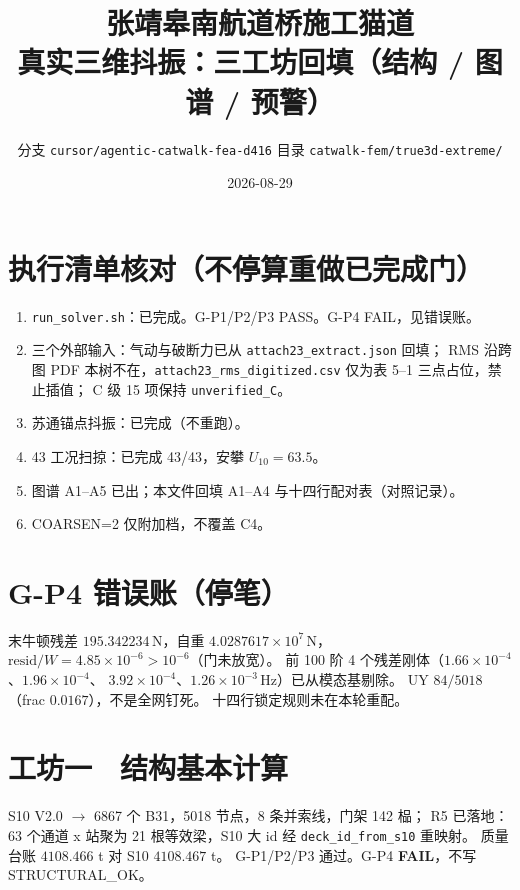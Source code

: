 \documentclass[11pt,a4paper]{ctexart}
\title{\bfseries 张靖皋南航道桥施工猫道\\真实三维抖振：三工坊回填（结构 / 图谱 / 预警）}
\author{分支 \texttt{cursor/agentic-catwalk-fea-d416} \quad 目录 \texttt{catwalk-fem/true3d-extreme/}}
\date{2026-08-29}
\begin{document}
\maketitle
\noindent{}

\section*{执行清单核对（不停算重做已完成门）}

\begin{enumerate}
  \item \texttt{run\_solver.sh}：已完成。G-P1/P2/P3 PASS。G-P4 FAIL，见错误账。
  \item 三个外部输入：气动与破断力已从 \texttt{attach23\_extract.json} 回填；
        RMS 沿跨图 PDF 本树不在，\texttt{attach23\_rms\_digitized.csv} 仅为表 5--1 三点占位，禁止插值；
        C 级 15 项保持 \texttt{unverified\_C}。
  \item 苏通锚点抖振：已完成（不重跑）。
  \item 43 工况扫掠：已完成 43/43，安攀 $U_{10}=63.5$。
  \item 图谱 A1--A5 已出；本文件回填 A1--A4 与十四行配对表（对照记录）。
  \item COARSEN=2 仅附加档，不覆盖 C4。
\end{enumerate}

\section*{G-P4 错误账（停笔）}

末牛顿残差 $195.342234$\,N，自重 $4.0287617\times10^{7}$\,N，
$\mathrm{resid}/W=4.85\times10^{-6}>10^{-6}$（门未放宽）。
前 100 阶 4 个残差刚体（$1.66\times10^{-4}$、$1.96\times10^{-4}$、
$3.92\times10^{-4}$、$1.26\times10^{-3}$\,Hz）已从模态基剔除。
UY $84/5018$（frac $0.0167$），不是全网钉死。
十四行锁定规则未在本轮重配。

\section{工坊一　结构基本计算}

S10 V2.0 $\to$ 6867 个 B31，5018 节点，8 条并索线，门架 142 榀；
R5 已落地：63 个通道 x 站聚为 21 根等效梁，S10 大 id 经 \texttt{deck\_id\_from\_s10} 重映射。
质量台账 $4108.466$ t 对 S10 $4108.467$ t。
G-P1/P2/P3 通过。G-P4 \textbf{FAIL}，不写 STRUCTURAL\_OK。
\end{document}
